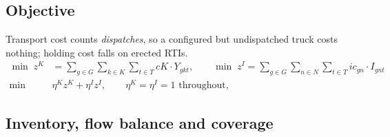 \subsection{Objective}

Transport cost counts \emph{dispatches}, so a configured but
undispatched truck costs nothing; holding cost falls on erected RTIs.
\begin{align}
\min\; z^{K} &= \sum_{g\in G}\sum_{k\in K}\sum_{t\in T} cK\cdot Y_{gkt},
\qquad
\min\; z^{I} = \sum_{g\in G}\sum_{n\in N}\sum_{t\in T} ic_{gn}\cdot I_{gnt}
    \label{sb:eq:obj-zK}\\
\min\;& \eta^{K} z^{K}+\eta^{I} z^{I},
    \qquad \eta^{K}=\eta^{I}=1 \text{ throughout},
\label{sb:eq:obj}
\end{align}
\subsection{Inventory, flow balance and coverage}


